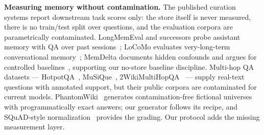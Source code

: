 \documentclass[conference]{IEEEtran}
\begin{document}
\textbf{Measuring memory without contamination.} The published curation
systems report downstream task scores only: the store itself is never
measured, there is no train/test split over questions, and the evaluation
corpora are parametrically contaminated. LongMemEval and successors probe
assistant memory with QA over past sessions~\cite{longmemeval};
LoCoMo evaluates very-long-term conversational memory~\cite{locomo};
MemDelta documents hidden confounds and argues for controlled
baselines~\cite{memdelta}, supporting our no-store baseline discipline.
Multi-hop QA datasets --- HotpotQA~\cite{hotpotqa}, MuSiQue~\cite{musique},
2WikiMultiHopQA~\cite{twowiki} --- supply real-text questions with annotated
support, but their public corpora are contaminated for current models.
PhantomWiki~\cite{phantomwiki} generates contamination-free fictional
universes with programmatically exact answers; our generator follows its
recipe, and SQuAD-style normalization~\cite{squad} provides the grading.
Our protocol adds the missing measurement layer.

\end{document}
